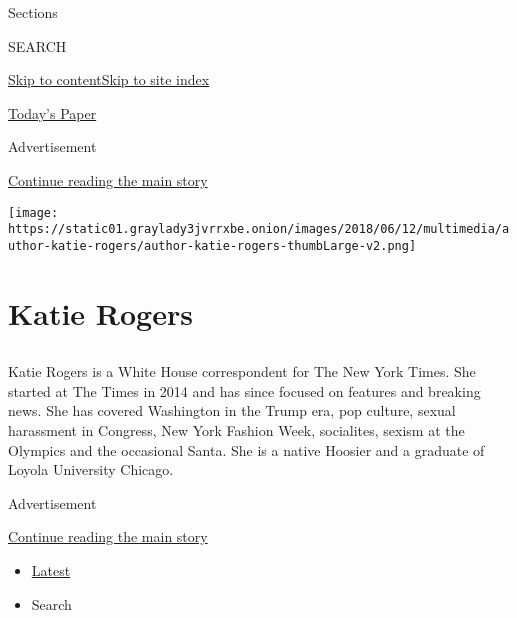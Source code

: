 Sections

SEARCH

\protect\hyperlink{site-content}{Skip to
content}\protect\hyperlink{site-index}{Skip to site index}

\href{https://myaccount.nytimes3xbfgragh.onion/auth/login?response_type=cookie\&client_id=vi}{}

\href{https://www.nytimes3xbfgragh.onion/section/todayspaper}{Today's
Paper}

Advertisement

\protect\hyperlink{after-top}{Continue reading the main story}

\texttt{[image: https://static01.graylady3jvrrxbe.onion/images/2018/06/12/multimedia/author-katie-rogers/author-katie-rogers-thumbLarge-v2.png]}

\hypertarget{katie-rogers}{%
\section{Katie Rogers}\label{katie-rogers}}

\subsection{}

Katie Rogers is a White House correspondent for The New York Times. She
started at The Times in 2014 and has since focused on features and
breaking news. She has covered Washington in the Trump era, pop culture,
sexual harassment in Congress, New York Fashion Week, socialites, sexism
at the Olympics and the occasional Santa. She is a native Hoosier and a
graduate of Loyola University Chicago.

Advertisement

\protect\hyperlink{after-mid1}{Continue reading the main story}

\begin{itemize}
\tightlist
\item
  \protect\hyperlink{stream-panel}{Latest}
\item
  Search
\end{itemize}

